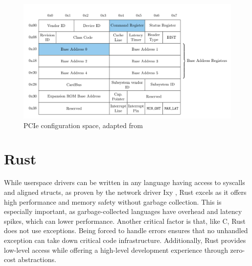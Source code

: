 \begin{figure}[H]
    \centering
    \includegraphics[width=\textwidth]{figures/pcie-config-space}
    \caption{PCIe configuration space, adapted from \cite{vroom}}
    \label{fig:pciconfig}
\end{figure}

\section{Rust}
While userspace drivers can be written in any language having access to syscalls and aligned structs, as proven by the network driver Ixy \cite{ixylanggithub}, Rust excels as it offers high performance and memory safety without garbage collection. This is especially important, as garbage-collected languages have overhead and latency spikes, which can lower performance. Another critical factor is that, like C, Rust does not use exceptions. Being forced to handle errors ensures that no unhandled exception can take down critical code infrastructure.
Additionally, Rust provides low-level access while offering a high-level development experience through zero-cost abstractions.

